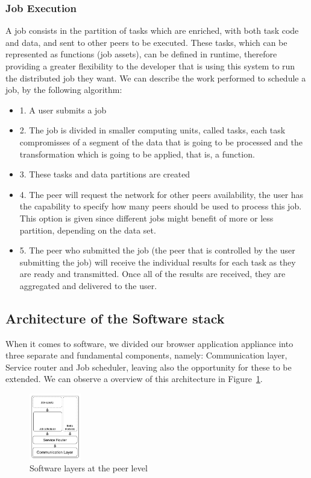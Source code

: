 \subsubsection{Job Execution}

A job consists in the partition of tasks which are enriched, with both task code and data, and sent to other peers to be executed. These tasks, which can be represented as functions (job assets), can be defined in runtime, therefore providing a greater flexibility to the developer that is using this system to run the distributed job they want. We can describe the work performed to schedule a job, by the following algorithm:

\begin{itemize}
    \item 1. A user submits a job
    \item 2. The job is divided in smaller computing units, called tasks, each task compromisses of a segment of the data that is going to be processed and the transformation which is going to be applied, that is, a function.
    \item 3. These tasks and data partitions are created
    \item 4. The peer will request the network for other peers availability, the user has the capability to specify how many peers should be used to process this job. This option is given since different jobs might benefit of more or less partition, depending on the data set.
    \item 5. The peer who submitted the job (the peer that is controlled by the user submitting the job) will receive the individual results for each task as they are ready and transmitted. Once all of the results are received, they are aggregated and delivered to the user.
\end{itemize}

\subsection{Architecture of the Software stack}

When it comes to software, we divided our browser application appliance into three separate and fundamental components, namely: Communication layer, Service router and Job scheduler, leaving also the opportunity for these to be extended. We can observe a overview of this architecture in Figure~\ref{fig:s-a-n-l}.

\begin{figure}[h!]
  \centering
  \includegraphics[width=0.2\textwidth]{figs/software-architecture-node-level}
  \caption{Software layers at the peer level}
  \label{fig:s-a-n-l}
\end{figure}


